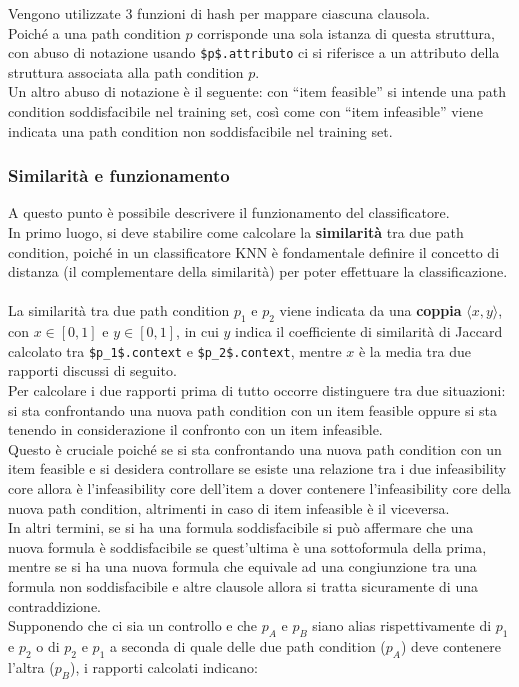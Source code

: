 \documentclass[a4paper, 12pt, oneside]{book}
\newcommand{\qq}[1]{``#1''}
\theoremstyle{normal}
\begin{document}
Vengono utilizzate 3 funzioni di hash per mappare ciascuna clausola.
\\ Poiché a una path condition $p$ corrisponde una sola istanza di questa struttura, con abuso di notazione usando \lstinline|$p$.attributo| ci si riferisce a un attributo della struttura associata alla path condition $p$. \\ Un altro abuso di notazione è il seguente: con \qq{item feasible} si intende una path condition soddisfacibile nel training set, così come con \qq{item infeasible} viene indicata una path condition non soddisfacibile nel training set.

\subsubsection{Similarità e funzionamento}
A questo punto è possibile descrivere il funzionamento del classificatore.
\\ In primo luogo, si deve stabilire come calcolare la \textbf{similarità} tra due path condition, poiché in un classificatore KNN è fondamentale definire il concetto di distanza (il complementare della similarità) per poter effettuare la classificazione. \\ \\ La similarità tra due path condition $p_1$ e $p_2$ viene indicata da una \textbf{coppia} $\langle x, y \rangle$, con $x \in [0, 1]$ e $y \in [0, 1]$, in cui $y$ indica il coefficiente di similarità di Jaccard calcolato tra \lstinline|$p_1$.context| e \lstinline|$p_2$.context|, mentre $x$ è la media tra due rapporti discussi di seguito. \\ Per calcolare i due rapporti prima di tutto occorre distinguere tra due situazioni: si sta confrontando una nuova path condition con un item feasible oppure si sta tenendo in considerazione il confronto con un item infeasible. \\ Questo è cruciale poiché se si sta confrontando una nuova path condition con un item feasible e si desidera controllare se esiste una relazione tra i due infeasibility core allora è l'infeasibility core dell'item a dover contenere l'infeasibility core della nuova path condition, altrimenti in caso di item infeasible è il viceversa. \\ In altri termini, se si ha una formula soddisfacibile si può affermare che una nuova formula è soddisfacibile se quest'ultima è una sottoformula della prima, mentre se si ha una nuova formula che equivale ad una congiunzione tra una formula non soddisfacibile e altre clausole allora si tratta sicuramente di una contraddizione. \\ Supponendo che ci sia un controllo e che $p_A$ e $p_B$ siano alias rispettivamente di $p_1$ e $p_2$ o di $p_2$ e $p_1$ a seconda di quale delle due path condition ($p_A$) deve contenere l'altra ($p_B$), i rapporti calcolati indicano:
\end{document}
